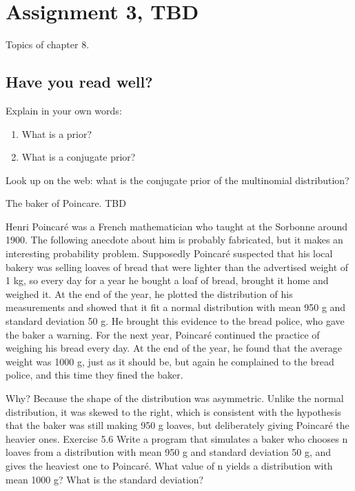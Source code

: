 \documentclass[assignments]{subfiles}
\begin{document}
\section{Assignment 3, TBD}
\label{sec:assignment-3}

Topics of chapter 8.

\subsection{Have you read well?}
\label{sec:have-you-read-1}

\begin{exercise}
Explain in your own words:
\begin{enumerate}
\item What is a prior?
\item What is a conjugate prior?
\end{enumerate}
\end{exercise}

\begin{exercise}
Look up on the web: what is the conjugate prior of the multinomial distribution?
\end{exercise}



\begin{exercise} The  baker of Poincare. TBD


Henri Poincaré was a French mathematician who taught at the Sorbonne around 1900. The following anecdote about him is probably fabricated, but it makes an interesting probability problem.
Supposedly Poincaré suspected that his local bakery was selling loaves of bread that were lighter than the advertised weight of 1 kg, so every day for a year he bought a loaf of bread, brought it home and weighed it. At the end of the year, he plotted the distribution of his measurements and showed that it fit a normal distribution with mean 950 g and standard deviation 50 g. He brought this evidence to the bread police, who gave the baker a warning.
For the next year, Poincaré continued the practice of weighing his bread every day. At the end of the year, he found that the average weight was 1000 g, just as it should be, but again he complained to the bread police, and this time they fined the baker.


Why? Because the shape of the distribution was asymmetric. Unlike the normal distribution, it was skewed to the right, which is consistent with the hypothesis that the baker was still making 950 g loaves, but deliberately giving Poincaré the heavier ones.
Exercise 5.6 Write a program that simulates a baker who chooses n loaves from a distribution with mean 950 g and standard deviation 50 g, and gives the heaviest one to Poincaré. What value of n yields a distribution with mean 1000 g? What is the standard deviation?

\end{exercise}
\end{document}
